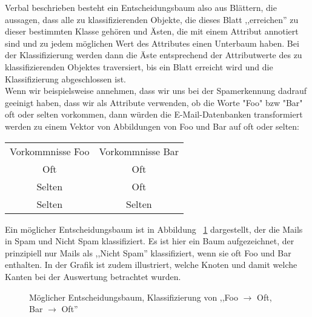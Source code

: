 \documentclass{article}
\theoremstyle{definition}
\theoremstyle{remark}
\begin{document}
Verbal beschrieben besteht ein Entscheidungsbaum also aus Bl\"attern,
die aussagen, dass alle zu klassifizierenden Objekte, die dieses Blatt 
,,erreichen'' zu dieser bestimmten Klasse geh\"oren und \"Asten, 
die mit einem Attribut annotiert sind und zu jedem m\"oglichen 
Wert des Attributes einen Unterbaum haben. Bei der Klassifizierung 
werden dann die \"Aste entsprechend der Attributwerte des zu 
klassifizierenden Objektes traversiert, bis ein Blatt erreicht 
wird und die Klassifizierung abgeschlossen ist.\\
Wenn wir beispielsweise annehmen, dass wir uns bei der Spamerkennung dadrauf
geeinigt haben, dass wir als Attribute verwenden, ob die Worte "Foo" bzw
"Bar" oft oder selten vorkommen, dann w\"urden die
E-Mail-Datenbanken transformiert werden zu einem Vektor von Abbildungen
von Foo und Bar auf oft oder selten:\\
\begin{tabular}{c c}
Vorkommnisse Foo & Vorkommnisse Bar \\
Oft & Oft \\
Selten & Oft \\
Selten & Selten \\
\end{tabular}
Ein m\"oglicher Entscheidungsbaum ist in Abbildung ~\ref{fig:decision_tree_example} 
dargestellt, der die Mails in Spam und Nicht Spam klassifiziert. Es ist hier ein
Baum aufgezeichnet, der prinzipiell nur Mails als ,,Nicht Spam'' klassifiziert,
wenn sie oft Foo und Bar enthalten. In der Grafik ist zudem illustriert, welche 
Knoten und damit welche Kanten bei der Auswertung betrachtet wurden.
\begin{figure}
\caption{M\"oglicher Entscheidungsbaum, Klassifizierung von 
,,Foo \(\rightarrow\) Oft, Bar \(\rightarrow\) Oft''}
\label{fig:decision_tree_example}
\end{figure}
\end{document}

